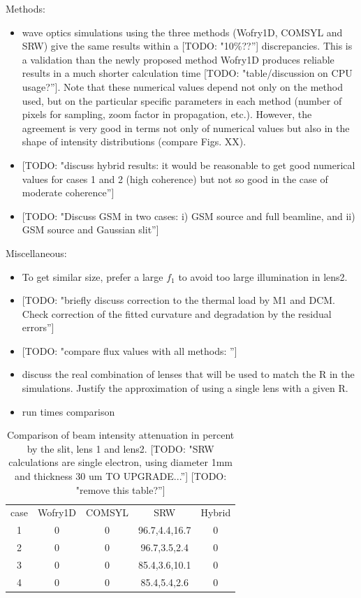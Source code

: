 \documentclass{iucr}              %
\newcommand{\todo}[1]{{\color{red}[TODO: "#1'']}}
\begin{document}
    
Methods:
\begin{itemize}
    \item wave optics simulations using the three methods (Wofry1D, COMSYL and SRW) give the same results within a \todo{10\%??} discrepancies. This is a validation than the newly proposed method Wofry1D produces reliable results in a much shorter calculation time \todo{table/discussion on CPU usage?}. Note that these numerical values depend not only on the method used, but on the particular specific parameters in each method (number of pixels for sampling, zoom factor in propagation, etc.). However, the agreement is very good in terms not only of numerical values but also in the shape of intensity distributions (compare Figs. XX).
    \item \todo{discuss hybrid results: it would be reasonable to get good numerical values for cases 1 and 2 (high coherence) but not so good in the case of moderate coherence}
    \item \todo{Discuss GSM in two cases: i) GSM source and full beamline, and ii) GSM source and Gaussian slit}
\end{itemize}

Miscellaneous: 
\begin{itemize}
    \item To get similar size, prefer a large $f_1$ to avoid too large illumination in lens2. 
    \item \todo{briefly discuss correction to the thermal load by M1 and DCM. Check correction of the fitted curvature and degradation by the residual errors}
    \item{\todo{compare flux values with all methods: }}
    \item discuss the real combination of lenses that will be used to match the R in the simulations. Justify the approximation of using a single lens with a given R. 
    \item run times comparison
\end{itemize}

\begin{table}[]
    \label{table:absorption}
    \caption{Comparison of beam intensity attenuation in percent by the slit, lens 1 and lens2.
    \todo{SRW calculations are single electron, using diameter 1mm and thickness 30 um TO UPGRADE...}
    \todo{remove this table?}
    }
    \centering
    \begin{tabular}{c|c|c|c|c}
case  & Wofry1D & COMSYL  & SRW& Hybrid \\
1     & 0       & 0       & 96.7,4.4,16.7   & 0 \\
2     & 0       & 0       & 96.7,3.5,2.4   & 0 \\
3     & 0       & 0       & 85.4,3.6,10.1   & 0 \\
4     & 0       & 0       & 85.4,5.4,2.6    & 0 
    \end{tabular}
\end{table}
\end{document}
